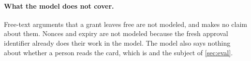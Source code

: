 \paragraph{What the model does not cover.} Free-text arguments that a grant leaves free are not modeled, and
 makes no claim about them. Nonces and expiry are not modeled because the fresh approval
identifier already does their work in the model. The model also says nothing about whether a person reads the
card, which is  and the subject of \cref{sec:eval}.
